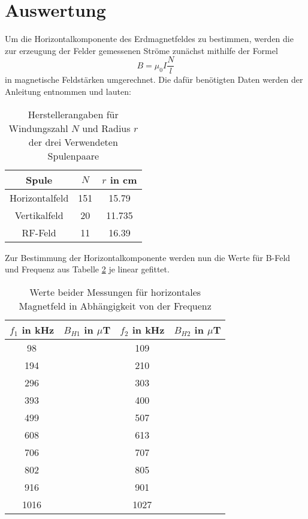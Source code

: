 \section{Auswertung}
\label{sec:Auswertung}
Um die Horizontalkomponente des Erdmagnetfeldes zu bestimmen, werden die zur erzeugung der Felder gemessenen Ströme zunächst mithilfe der Formel
\begin{equation}
  B = \mu_0 I \frac{N}{l}
  \label{eqn:Spulenbfeld}
\end{equation}
in magnetische Feldstärken umgerechnet.
Die dafür benötigten Daten werden der Anleitung\cite{Anleitung} entnommen und lauten:
\begin{table}[H]
  \centering
  \caption{Herstellerangaben für Windungszahl $N$ und Radius $r$ der drei Verwendeten Spulenpaare}
  \label{tab:Spulendaten}
  \begin{tabular}{ccc}
    Spule & $N$ &$r$ in cm\\
    \hline
    Horizontalfeld& 151 & 15.79\\
    Vertikalfeld  & 20  & 11.735\\
    RF-Feld       & 11  & 16.39\\
  \end{tabular}
\end{table}
Zur Bestimmung der Horizontalkomponente werden nun die Werte für B-Feld und Frequenz aus Tabelle \ref{tab:messung} je linear gefittet.
\begin{table}
  \caption{Werte beider Messungen für horizontales Magnetfeld in Abhängigkeit von der Frequenz}
  \label{tab:messung}
  \begin{tabular}{|c|c|c|c|}
    $f_1$ in kHz & $B_{H1}$ in $\mu$T &$f_2$ in kHz & $B_{H2}$ in $\mu$T\\
    \hline
     98& & 109& \\
     194& & 210&\\
     296& & 303&\\
     393& & 400&\\
     499& & 507&\\
     608& & 613&\\
     706& & 707&\\
     802& & 805&\\
     916& & 901&\\
     1016& & 1027&\\
  \end{tabular}
\end{table}
